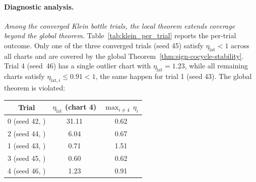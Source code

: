 \documentclass[11pt]{article}
\newcommand{\cmark}{\ding{51}}
\newcommand{\xmark}{\ding{55}}
\theoremstyle{plain}
\theoremstyle{definition}
\theoremstyle{remark}
\begin{document}
\paragraph{Diagnostic analysis.}
\emph{Among the converged Klein bottle trials, the local 
theorem extends coverage beyond the global theorem.} Table~\ref{tab:klein_per_trial} reports the per-trial outcome. Only one of 
the three converged trials (seed 45) satisfy 
$\eta_{\mathrm{lat}} < 1$ across all charts and are covered by 
the global Theorem~\ref{thm:sign-cocycle-stability}.  Trial 4 (seed~46) has a single outlier chart with 
$\eta_{\mathrm{lat}} = 1.23$, while all remaining charts 
satisfy $\eta_{\mathrm{lat},i} \leq 0.91 < 1$, the same happen for trial 1 (seed 43).  The global 
theorem is violated:
\begin{center}
\begin{tabular}{ccc}
\toprule
Trial & $\eta_{\mathrm{lat}}$ (chart 4) & $\max_{i \neq 4}\, \eta_i$ \\
\midrule
0 (seed 42, \xmark) & 31.11 & 0.62 \\
2 (seed 44, \xmark) & 6.04  & 0.67 \\
\midrule
1 (seed 43, \cmark) & 0.71  & 1.51 \\
3 (seed 45, \cmark) & 0.60  & 0.62 \\
4 (seed 46, \cmark) & 1.23  & 0.91 \\
\bottomrule
\end{tabular}
\end{center}
\end{document}
